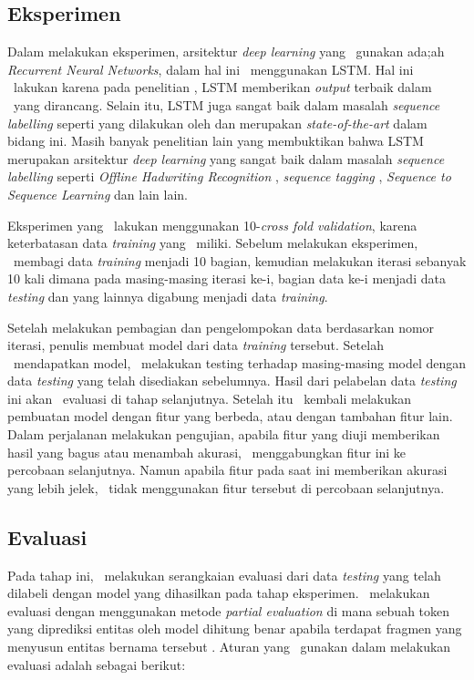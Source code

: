 	\subsection{Eksperimen}
	Dalam melakukan eksperimen, arsitektur \textit{deep learning} yang \saya~gunakan ada;ah \textit{Recurrent Neural Networks}, dalam hal ini \saya~menggunakan LSTM. Hal ini \saya~lakukan karena pada penelitian \cite{mujiono2016new}, LSTM memberikan \textit{output} terbaik dalam \mer~yang dirancang. Selain itu, LSTM juga sangat baik dalam masalah \textit{sequence labelling} seperti yang dilakukan oleh \cite{graves2013speech} dan merupakan \textit{state-of-the-art} dalam bidang ini. Masih banyak penelitian lain yang membuktikan bahwa LSTM merupakan arsitektur \textit{deep learning} yang sangat baik dalam masalah \textit{sequence labelling} seperti \textit{Offline Hadwriting Recognition} \citep{graves2009offline}, \textit{sequence tagging} \citep{huang2015bidirectional}, \textit{Sequence to Sequence Learning} \citep{NIPS2014_5346} dan lain lain.
	
	Eksperimen yang \saya~lakukan menggunakan 10-\textit{cross fold validation}, karena keterbatasan data \textit{training} yang \saya~miliki. Sebelum melakukan eksperimen, \saya~membagi data \textit{training} menjadi 10 bagian, kemudian melakukan iterasi sebanyak 10 kali dimana pada masing-masing iterasi ke-i, bagian data ke-i menjadi data \textit{testing} dan yang lainnya digabung menjadi data \textit{training}. 
	
	Setelah melakukan pembagian dan pengelompokan data berdasarkan nomor iterasi, penulis membuat model dari data \textit{training} tersebut. Setelah \saya~mendapatkan model, \saya~melakukan testing terhadap masing-masing model dengan data \textit{testing} yang telah disediakan sebelumnya. Hasil dari pelabelan data \textit{testing} ini akan \saya~evaluasi di tahap selanjutnya. Setelah itu \saya~kembali melakukan pembuatan model dengan fitur yang berbeda, atau dengan tambahan fitur lain. Dalam perjalanan melakukan pengujian, apabila fitur yang diuji memberikan hasil yang bagus atau menambah akurasi, \saya~menggabungkan fitur ini ke percobaan selanjutnya. Namun apabila fitur pada saat ini memberikan akurasi yang lebih jelek, \saya~tidak menggunakan fitur tersebut di percobaan selanjutnya.
	
	\subsection{Evaluasi}
	Pada tahap ini, \saya~melakukan serangkaian evaluasi dari data \textit{testing} yang telah dilabeli dengan model yang dihasilkan pada tahap eksperimen. \Saya~melakukan evaluasi dengan menggunakan metode \textit{partial evaluation} di mana sebuah token yang diprediksi entitas oleh model dihitung benar apabila terdapat fragmen yang menyusun entitas bernama tersebut \citep{seki2003probabilistic}. Aturan yang \saya~gunakan dalam melakukan evaluasi adalah sebagai berikut: 
	
